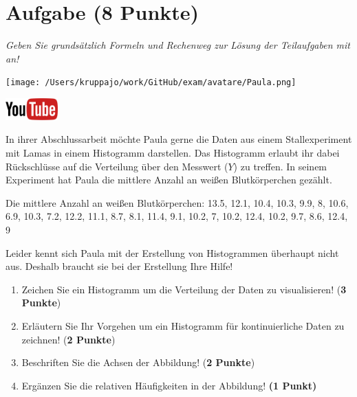 \documentclass[a4paper, 9pt]{scrartcl}\usepackage[]{graphicx}\usepackage[]{xcolor}
\begin{document}
 
\clearpage

\section{Aufgabe \hfill (8 Punkte)}

\textit{Geben Sie grundsätzlich Formeln und Rechenweg zur Lösung der Teilaufgaben mit an!} \\[1Ex]
 

 
\begin{minipage}[t]{0.5\textwidth}
\texttt{[image: /Users/kruppajo/work/GitHub/exam/avatare/Paula.png]}
\end{minipage}
\begin{minipage}[t]{0.5\textwidth}
\hfill
\href{https://youtu.be/ORHSPTCdfeY}{\includegraphics[width = 2cm]{img/youtube}}\\[1Ex]
\end{minipage}
\vspace{1ex}



In ihrer Abschlussarbeit möchte Paula gerne die Daten aus einem Stallexperiment mit Lamas in einem Histogramm darstellen. Das Histogramm erlaubt ihr dabei Rückschlüsse auf die Verteilung über den Messwert ($Y$) zu treffen. In seinem Experiment hat Paula die mittlere Anzahl an weißen Blutkörperchen gezählt.

\begin{center}
Die mittlere Anzahl an weißen Blutkörperchen: 13.5, 12.1, 10.4, 10.3, 9.9, 8, 10.6, 6.9, 10.3, 7.2, 12.2, 11.1, 8.7, 8.1, 11.4, 9.1, 10.2, 7, 10.2, 12.4, 10.2, 9.7, 8.6, 12.4, 9
\end{center}

Leider kennt sich Paula mit der Erstellung von Histogrammen überhaupt nicht aus. Deshalb braucht sie bei der Erstellung Ihre Hilfe!

\begin{enumerate}
\item Zeichen Sie ein Histogramm um die Verteilung der Daten zu
  visualisieren! (\textbf{3 Punkte})
 \item Erläutern Sie Ihr Vorgehen um ein Histogramm für kontinuierliche
  Daten zu zeichnen!  (\textbf{2 Punkte})
\item Beschriften Sie die Achsen der Abbildung! (\textbf{2 Punkte})
\item Ergänzen Sie die relativen Häufigkeiten in der Abbildung! \textbf{(1
    Punkt)}  
\end{enumerate}
\end{document}
